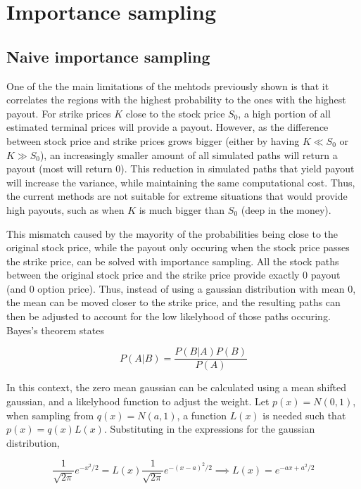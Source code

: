 \documentclass[11pt,oneside,parskip=half]{scrbook}  %
\begin{document}
\chapter{Importance sampling}
\section{Naive importance sampling}

One of the the main limitations of the mehtods previously shown is that it correlates the regions with the highest probability to the ones with the highest payout. For strike prices $K$ close to the stock price $S_0$, a high portion of all estimated terminal prices will provide a payout. However, as the difference between stock price and strike prices grows bigger (either by having $K\ll S_0$ or $K\gg S_0$), an increasingly smaller amount of all simulated paths will return a payout (most will return $0$). This reduction in simulated paths that yield payout will increase the variance, while maintaining the same computational cost. Thus, the current methods are not suitable for extreme situations that would provide high payouts, such as when $K$ is much bigger than $S_0$ (deep in the money).

This mismatch caused by the mayority of the probabilities being close to the original stock price, while the payout only occuring when the stock price passes the strike price, can be solved with importance sampling. All the stock paths between the original stock price and the strike price provide exactly 0 payout (and 0 option price). Thus, instead of using a gaussian distribution with mean 0, the mean can be moved closer to the strike price, and the resulting paths can then be adjusted to account for the low likelyhood of those paths occuring. Bayes's theorem states

$$
P(A|B)=\frac{P(B|A)P(B)}{P(A)}
$$

In this context, the zero mean gaussian can be calculated using a mean shifted gaussian, and a likelyhood function to adjust the weight. Let $p(x)=N(0,1)$, when sampling from $q(x)=N(a,1)$, a function $L(x)$ is needed such that $p(x)=q(x)L(x)$. Substituting in the expressions for the gaussian distribution,

$$
\frac{1}{\sqrt{2\pi}}e^{-x^2/2}=L(x)\frac{1}{\sqrt{2\pi}}e^{-(x-a)^2/2}\implies L(x)=e^{-ax+a^2/2}
$$
\end{document}
